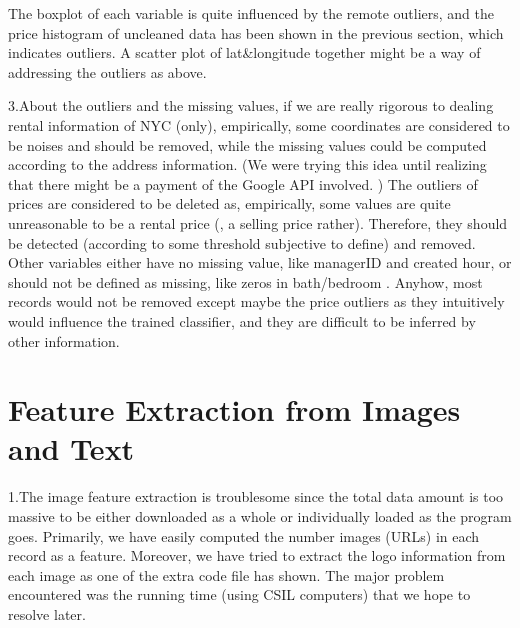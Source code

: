 \documentclass[10pt,twocolumn,letterpaper]{article}
\begin{document}
The boxplot of each variable is quite influenced by the remote outliers, and the price histogram of uncleaned data has been shown in the previous section, which indicates outliers. A scatter plot of lat&longitude together might be a way of addressing the outliers as above. 




3.About the outliers and the missing values, if we are really rigorous to dealing rental information of NYC (only), empirically, some coordinates are considered to be noises and should be removed, while the missing values could be computed according to the address information. (We were trying this idea until realizing that there might be a payment of the Google API involved. ) The outliers of prices are considered to be deleted as, empirically, some values are quite unreasonable to be a rental price (, a selling price rather). Therefore, they should be detected (according to some threshold subjective to define) and removed. 
Other variables either have no missing value, like managerID and created hour, or should not be defined as missing, like zeros in bath/bedroom . Anyhow, most records would not be removed except maybe the price outliers as they intuitively would influence the trained classifier, and they are difficult to be inferred by other information.










\section{Feature Extraction from Images and Text}
1.The image feature extraction is troublesome since the total data amount is too massive to be either downloaded as a whole or individually  loaded as the program goes. Primarily, we have easily computed the number images (URLs) in each record as a feature. Moreover, we have tried to extract the logo information from each image as one of the extra code file has shown. The major problem encountered was the running time (using CSIL computers) that we hope to resolve later.
\end{document}
